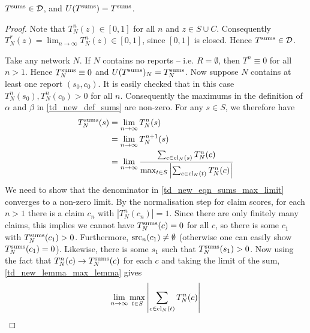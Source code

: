 \begin{lemma}
    \label{td_new_lemma_sums_fixedpoint}
    $T^{\operatorname{sums}} \in \mathcal{D}$, and $U(T^{\operatorname{sums}}) = T^{\operatorname{sums}}$.
\end{lemma}

\begin{proof}
Note
    that $T_N^n(z) \in [0, 1]$ for all $n$ and $z \in S \cup C$. Consequently
    $T_N^*(z) = \lim_{n \to \infty}{T^n_N(z)} \in [0, 1]$, since $[0, 1]$ is
    closed. Hence $T^{\operatorname{sums}} \in \mathcal{D}$.

    Take any network $N$. If $N$ contains no reports -- i.e. $R = \emptyset$,
    then $T^n \equiv 0$ for all $n > 1$. Hence $T^{\operatorname{sums}}_N \equiv 0$ and
    $U(T^{\operatorname{sums}})_N = T^{\operatorname{sums}}_N$. Now suppose $N$ contains at least one report $(s_0,
    c_0)$. It is easily checked that in this case $T_N^n(s_0), T_N^n(c_0) > 0$
    for all $n$.  Consequently the maximums in the definition of $\alpha$ and
    $\beta$ in \cref{td_new_def_sums} are non-zero. For any $s \in S$, we
    therefore have
    \begin{align}
        T^{\operatorname{sums}}_N(s)
        &= \lim_{n \to \infty}{T^n_N(s)} \nonumber \\
        &= \lim_{n \to \infty}{T^{n+1}_N(s)} \nonumber \\
        &= \lim_{n \to \infty}{
            \frac{
                \sum_{c \in \operatorname{cl}_N(s)}{
                    T^n_N(c)
                }
            }{
                \max_{t \in S}{\left|
                    \sum_{c \in \operatorname{cl}_N(t)}{
                        T^n_N(c)
                    }
                    \right|
                }
            }
        }
        \label{td_new_eqn_sums_max_limit}
    \end{align}
    We need to show that the denominator in \cref{td_new_eqn_sums_max_limit}
    converges to a non-zero limit. By the normalisation step for claim scores,
    for each $n > 1$ there is a claim $c_n$ with $|T^n_N(c_n)| = 1$. Since
    there are only finitely many claims, this implies we cannot have
    $T^{\operatorname{sums}}_N(c) = 0$ for all $c$, so there is some $c_1$ with $T^{\operatorname{sums}}_N(c_1) >
    0$. Furthermore, $\operatorname{src}_n(c_1) \ne \emptyset$ (otherwise one can easily
    show $T^{\operatorname{sums}}_N(c_1) = 0$). Likewise, there is some $s_1$ such that
    $T^{\operatorname{sums}}_N(s_1) > 0$. Now using the fact that $T^n_N(c) \to T^{\operatorname{sums}}_N(c)$ for
    each $c$ and taking the limit of the sum, \cref{td_new_lemma_max_lemma}
    gives
    \[
        \lim_{n \to \infty}{
            \max_{t \in S}{\left|
                \sum_{c \in \operatorname{cl}_N(t)}{
                    T^n_N(c)
                }
                \right|
}}\]
\end{proof}
